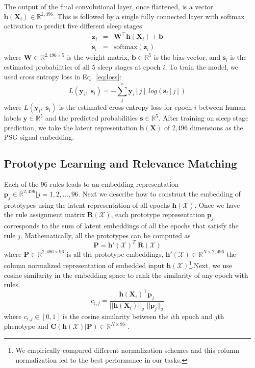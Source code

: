 \documentclass[pmlr]{jmlr}
\begin{document}
The output of the final convolutional layer, once flattened, is a vector $\bm{h}(\bm{X}_i) \in \mathbb{R}^{2,496}$. This is followed by a single fully connected layer with softmax activation to predict five different sleep stages:
\begin{eqnarray*} \label{eq:softmax}
    \bm{z}_i &=& \bm{W}^\top \bm{h}(\bm{X}_i) + \bm{b} \\
    \bm{s}_i &=& \text{softmax}(\bm{z}_i)
\end{eqnarray*}
where $\bm{W}\in \mathbb{R}^{2,496\times 5}$ is the weight matrix, $\bm{b}\in\mathbb{R}^5$ is the bias vector, and $\bm{s}_i$ is the estimated probabilities of all 5 sleep stages at epoch $i$. To train the model, we used cross entropy loss in Eq.~\ref{eq:loss}:
\begin{equation} \label{eq:loss}
    L(\bm{y}_i,\; \bm{s}_i) =  - \sum_j^5 \bm{y}_i[j] \; log ( \bm{s}_i[j])
\end{equation} 
where $L(\bm{y}_i,\; \bm{s}_i)$ is the estimated cross entropy loss for epoch $i$ between human labels $\bm{y} \in \mathbb{R}^5$ and the predicted probabilities $\bm{s}\in \mathbb{R}^5$. After training on sleep stage prediction, we take the latent representation $\bm{h}(\bm{X})$ of 2,496 dimensions as the PSG signal embedding. 

\subsection{Prototype Learning and Relevance Matching} \label{sec:prototype}
Each of the 96 rules leads to an embedding representation $\bm{p}_j \in \mathbb{R}^{2,496}| j = 1,2,\ldots, 96$. 
Next we describe how to construct the embedding of prototypes using the latent representation of all epochs $\bm{h}(\mathcal{X})$. 
Once we have the rule assignment matrix $\bm{R}(\mathcal{X})$, each prototype representation $\bm{p}_j$ corresponds to the sum of latent embeddings of all the epochs that satisfy the rule $j$. Mathematically, all the prototypes can be computed as 
\begin{equation}\label{eq:prototypes}
    \bm{P} =  \bm{h'}(\mathcal{X})^T \; \bm{R}(\mathcal{X}) \end{equation}
where $\bm{P} \in \mathbb{R}^{2,496\times96}$ is all the prototype embeddings, $\bm{h'}(\mathcal{X})\in \mathbb{R}^{N\times2,496}$ the column normalized representation of embedded input $\bm{h}(\mathcal{X})$\footnote{We empirically compared different normalization schemes and this column normalization led to the best performance in our tasks.}.Next, we use cosine similarity in the embedding space to rank the similarity of any epoch with rules.
\begin{equation} \label{eq:cosine}
    c_{i, j} = \frac{\bm{h}(\bm{X}_i)^\top \bm{p}_{j} }{  ||\bm{h}(\bm{X}_i)||_2 \; ||\bm{p}_{j}||_2 }
\end{equation}
where $c_{i, j} \in [0,1]$ is the cosine similarity between the $i$th epoch and $j$th phenotype and $\bm{C}(\bm{h}(\mathcal{X}) | \bm{P})\in \mathbb{R}^{N\times96}$ .
\end{document}
